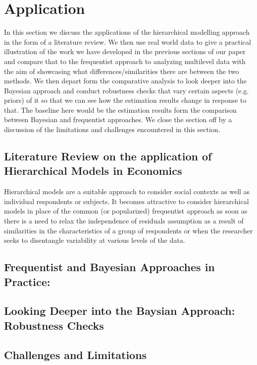 \section{Application}

In this section we discuss the applications of the hierarchical modelling approach in the form of a literature review. We then use real world data to give a practical illustration of the work we have developed in the previous sections of our paper and compare that to the frequentist approach to analyzing multilevel data with the aim of showcasing what differences/similarities there are between the two methods. We then depart form the comparative analysis to look deeper into the Bayesian approach and conduct robustness checks that vary certain aspects (e.g. priors) of it so that we can see how the estimation results change in response to that. The baseline here would be the estimation results form the comparison between Bayesian and frequentist approaches. We close the section off by a discussion of the limitations and challenges encountered in this section.


\subsection{Literature Review on the application of Hierarchical Models in Economics}

Hierarchical models are a suitable approach to consider social contexts as well as individual respondents or subjects. It becomes attractive to consider hierarchical models in place of the common (or popularized) frequentist approach as soon as there is a need to relax the independence of residuals assumption as a result of similarities in the characteristics of a group of respondents or when the researcher seeks to disentangle variability at various levels of the data. 

\subsection{Frequentist and Bayesian Approaches in Practice:}

\subsection{Looking Deeper into the Baysian Approach: Robustness Checks}

\subsection{Challenges and Limitations}






